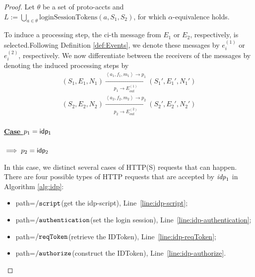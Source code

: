   \begin{proof}
    Let $\theta$ be a set of proto-accts and 
    $L:=\bigcup_{a\in\theta}\text{loginSessionTokens}(a,S_1,S_2)$, 
    for which $\alpha$-equivalence holds.
    
    To induce a processing step, the ci-th message from $E_1$ or 
    $E_2$, respectively, is selected.Following Definition 
    \ref{def:Events}, we denote these messages by $e_i^{(1)}$ or 
    $e_i^{(2)}$, respectively. We now differentiate between the 
    receivers of the messages by denoting the induced processing 
    steps by
    \begin{equation}
      \begin{aligned}
        (S_1,E_1,N_1)\xrightarrow[p_1\rightarrow E_{out}^{(1)}]{\left \langle a_1,f_1,m_1\right \rangle\rightarrow p_1}(S_1\prime,E_1\prime,N_1\prime)\\
        (S_2,E_2,N_2)\xrightarrow[p_2\rightarrow E_{out}^{(2)}]{\left \langle a_2,f_2,m_2\right \rangle\rightarrow p_2}(S_2\prime,E_2\prime,N_2\prime)
      \end{aligned}
    \end{equation}
    \paragraph{\underline{Case $p_1 = \mathsf{idp_1}$}}
    $\implies p_2 = \mathsf{idp_2}$

    In this case, we distinct several cases of HTTP(S) requests that can happen.
    There are four possible types of HTTP requests that are accepted by $\mathit{idp}_1$ in Algorithm \ref{alg:idp}:
    
    \begin{itemize}
      \item path=$\mathtt{/script}$(get the idp-script), Line~\ref{line:idp-script};
      \item path=$\mathtt{/authentication}$(set the login session), Line~\ref{line:idp-authentication};
      \item path=$\mathtt{/reqToken}$(retrieve the IDToken), Line~\ref{line:idp-reqToken};
      \item path=$\mathtt{/authorize}$(construct the IDToken), Line~\ref{line:idp-authorize}.
    \end{itemize}


\end{proof}
